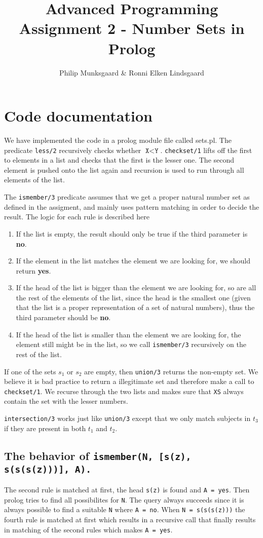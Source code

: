 \documentclass{article}
\title{Advanced Programming Assignment 2 - Number Sets in Prolog}
\author{Philip Munksgaard \& Ronni Elken Lindsgaard}
\newcommand{\prolog}[1]{\texttt{#1}}
\newcommand{\direction}[1]{\textbf{#1}}
\begin{document}
\maketitle
\section{Code documentation}
We have implemented the code in a prolog module file called
sets.pl. The predicate
\prolog{less/2} recursively checks whether $\prolog{X} < \prolog{Y}$.
\prolog{checkset/1} lifts off the first to elements in a list and
checks that the first is the lesser one. The second element is pushed
onto the list again and recursion is used to run through all elements
of the list.

The \prolog{ismember/3} predicate assumes that we get a proper natural
number set as defined in the assigment, and mainly uses pattern
matching in order to decide the result. The logic for each rule is
described here
\begin{enumerate}
  \item If the list is empty, the result should only be true if the third
    parameter is \direction{no}.
  \item If the element in the list matches the element we are looking for, we should return \direction{yes}.
  \item If the head of the list is bigger than the element we are
    looking for, so are all the rest of the elements of the list,
    since the head is the smallest one (given that the list is a
    proper representation of a set of natural numbers), thus the third
    parameter should be \direction{no}.
  \item If the head of the list is smaller than the element we are
    looking for, the element still might be in the list, so we call
    \prolog{ismember/3} recursively on the rest of the list.
\end{enumerate}

If one of the sets $s_1$ or $s_2$ are empty, then \prolog{union/3} returns the
non-empty set. We believe it is bad practice to return a illegitimate set and
therefore make a call to \prolog{checkset/1}.
We recurse through the two lists and makes sure that \prolog{XS} always contain
the set with the lesser numbers.

\prolog{intersection/3} works just like \prolog{union/3} except that we only
match subjects in $t_3$ if they are present in both $t_1$ and $t_2$.

\subsection{The behavior of \prolog{ismember(N, [s(z), s(s(s(z)))], A).}}
The second rule is matched at first, the head \prolog{s(z)} is found and
\prolog{A = yes}. Then prolog tries to find all possibilites for \prolog{N}. The
query always succeeds since it is always possible to find a suitable \prolog{N}
where \prolog{A = no}. When \prolog{N = s(s(s(z)))} the fourth rule is matched
at first which results in a recursive call that finally results in matching of
the second rules which makes \prolog{A = yes}.
\end{document}
